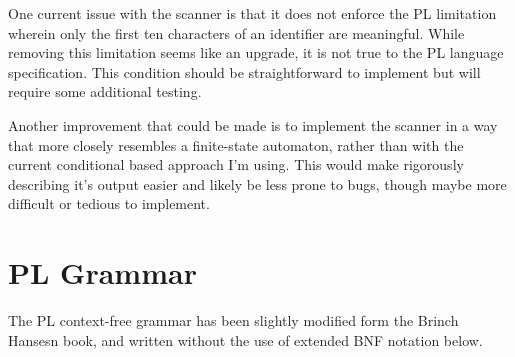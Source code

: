 \documentclass{article}
\begin{document}
        One current issue with the scanner is that it does not enforce the PL limitation wherein only the first ten characters of an identifier are meaningful. While removing this limitation seems like an upgrade, it is not true to the PL language specification. This condition should be straightforward to implement but will require some additional testing.

        Another improvement that could be made is to implement the scanner in a way that more closely resembles a finite-state automaton, rather than with the current conditional based approach I'm using. This would make rigorously describing it's output easier and likely be less prone to bugs, though maybe more difficult or tedious to implement.


    \pagebreak
    \section{PL Grammar}
    The PL context-free grammar has been slightly modified form the Brinch Hansesn book, and written without the use of extended BNF notation below.
\end{document}
